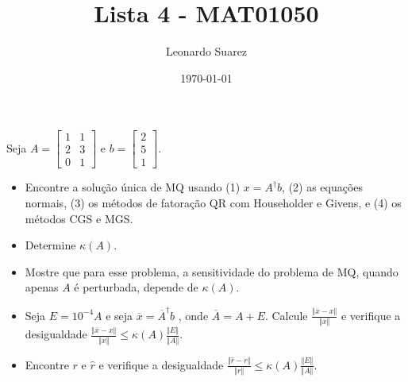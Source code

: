 \documentclass{article}
\title{Lista 4 - MAT01050}
\author{Leonardo Suarez}
\date{\today}
\begin{document}
\maketitle

\begin{unprblm}
    Seja \(A = \begin{bmatrix}
        1 & 1 \\
        2 & 3 \\
        0 & 1
    \end{bmatrix}\) e \(b = \begin{bmatrix}
        2 \\
        5 \\
        1
    \end{bmatrix}\).
    \begin{itemize}
        \item Encontre a solução única de MQ usando (1) \(x = A^\dagger b\), (2) as equações normais, (3) os métodos de fatoração QR com Householder e Givens, e (4) os métodos CGS e MGS.
        \item Determine \(\kappa(A)\).
        \item Mostre que para esse problema, a sensitividade do problema de MQ, quando apenas \(A\) é perturbada, depende de \(\kappa(A)\).
        \item Seja \(E = 10^{-4}A\) e seja \(\overline{x} = \overline{A}^\dagger b\) , onde \(\overline{A} = A + E\). Calcule \(\frac{\Vert \overline{x}-x \Vert}{\Vert x \Vert}\) e verifique a desigualdade \(\frac{\Vert \overline{x}-x \Vert}{\Vert x \Vert} \leq \kappa(A) \frac{\Vert E \Vert}{\Vert A \Vert}\).
        \item Encontre \(r\) e \(\hat{r}\) e verifique a desigualdade \(\frac{\Vert \hat{r} - r \Vert}{\Vert r \Vert} \leq \kappa(A) \frac{\Vert E \Vert}{\Vert A \Vert}\).
    \end{itemize}
\end{unprblm}

\begin{unprblm}

\end{unprblm}

\begin{unprblm}

\end{unprblm}
\end{document}
